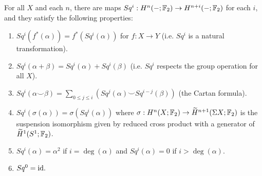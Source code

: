 \documentclass{MetricNotes2023}
\def\bb{\ensuremath\mathbb}
\def\inte{\ensuremath\mathbb{Z}}
\def\id{\ensuremath\text{id}}
\def\wildetilde{\ensuremath\widetilde}
\begin{document}
\begin{proposition}\label{2504201153}
For all \(X\) and each \(n\), there are maps \(Sq^i : H^n(-; \bb{F}_2)\to H^{n+i}(- ; \bb{F}_2)\) for each \(i\), and they satisfy the following properties: \begin{enumerate}
\item \(Sq^i(f^*(\alpha))=f^*(Sq^i(\alpha))\) for \(f : X \to Y\) (i.e. \(Sq^i\) is a natural transformation).
\item \(Sq^i(\alpha + \beta)=Sq^i(\alpha)+Sq^i(\beta)\) (i.e. \(Sq^i\) respects the group operation for all \(X\)).
\item \(Sq^i(\alpha \smile \beta)=\sum\limits_{0\leq j \leq i} (Sq^j(\alpha)\smile Sq^{i-j}(\beta))\) (the Cartan formula).
\item \(Sq^i(\sigma(\alpha))=\sigma(Sq^i(\alpha))\) where \(\sigma : H^n(X; \bb{F}_2)\to \widetilde{H}^{n+1}(\Sigma X; \bb{F}_2)\) is the suspension isomorphism given by reduced cross product with a generator of \(\widetilde{H}^1(S^1; \bb{F}_2)\).%
\item \(Sq^i(\alpha)=\alpha^2\) if \(i=\deg(\alpha)\) and \(Sq^i(\alpha)=0\) if \(i> \deg(\alpha)\). 
\item \(Sq^0=\id.\)
\end{enumerate}
\end{proposition}
\end{document}
